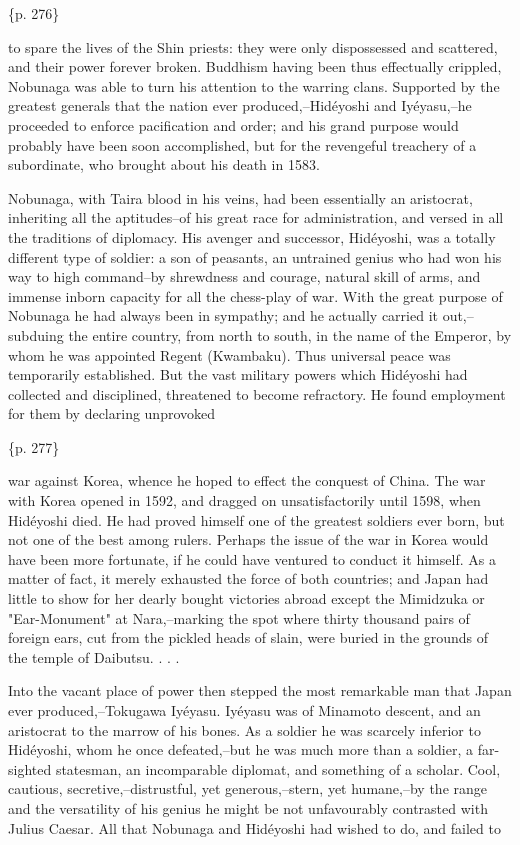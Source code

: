 \{p. 276\}

to spare the lives of the Shin priests: they were only dispossessed and scattered, and their power forever broken. Buddhism having been thus effectually crippled, Nobunaga was able to turn his attention to the warring clans. Supported by the greatest generals that the nation ever produced,--Hidéyoshi and Iyéyasu,--he proceeded to enforce pacification and order; and his grand purpose would probably have been soon accomplished, but for the revengeful treachery of a subordinate, who brought about his death in 1583.

Nobunaga, with Taira blood in his veins, had been essentially an aristocrat, inheriting all the aptitudes--of his great race for administration, and versed in all the traditions of diplomacy. His avenger and successor, Hidéyoshi, was a totally different type of soldier: a son of peasants, an untrained genius who had won his way to high command--by shrewdness and courage, natural skill of arms, and immense inborn capacity for all the chess-play of war. With the great purpose of Nobunaga he had always been in sympathy; and he actually carried it out,--subduing the entire country, from north to south, in the name of the Emperor, by whom he was appointed Regent (Kwambaku). Thus universal peace was temporarily established. But the vast military powers which Hidéyoshi had collected and disciplined, threatened to become refractory. He found employment for them by declaring unprovoked

\{p. 277\}

war against Korea, whence he hoped to effect the conquest of China. The war with Korea opened in 1592, and dragged on unsatisfactorily until 1598, when Hidéyoshi died. He had proved himself one of the greatest soldiers ever born, but not one of the best among rulers. Perhaps the issue of the war in Korea would have been more fortunate, if he could have ventured to conduct it himself. As a matter of fact, it merely exhausted the force of both countries; and Japan had little to show for her dearly bought victories abroad except the Mimidzuka or "Ear-Monument" at Nara,--marking the spot where thirty thousand pairs of foreign ears, cut from the pickled heads of slain, were buried in the grounds of the temple of Daibutsu. . . .

Into the vacant place of power then stepped the most remarkable man that Japan ever produced,--Tokugawa Iyéyasu. Iyéyasu was of Minamoto descent, and an aristocrat to the marrow of his bones. As a soldier he was scarcely inferior to Hidéyoshi, whom he once defeated,--but he was much more than a soldier, a far-sighted statesman, an incomparable diplomat, and something of a scholar. Cool, cautious, secretive,--distrustful, yet generous,--stern, yet humane,--by the range and the versatility of his genius he might be not unfavourably contrasted with Julius Caesar. All that Nobunaga and Hidéyoshi had wished to do, and failed to

